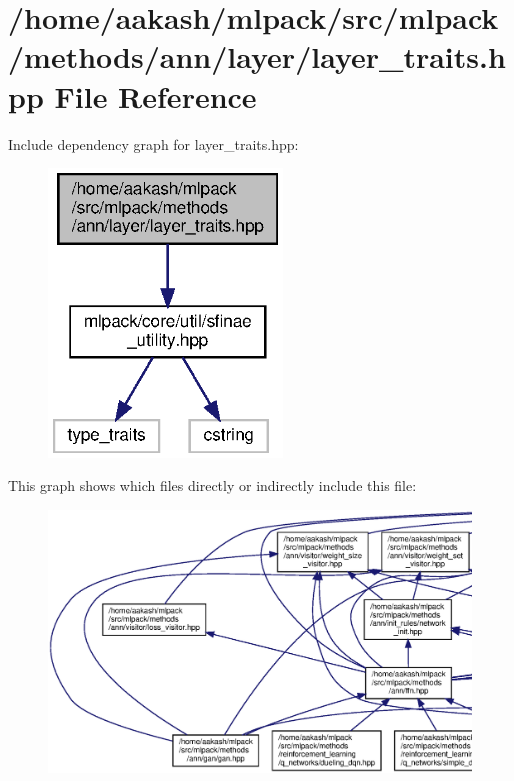 \section{/home/aakash/mlpack/src/mlpack/methods/ann/layer/layer\+\_\+traits.hpp File Reference}
\label{layer__traits_8hpp}
Include dependency graph for layer\+\_\+traits.\+hpp\+:
\nopagebreak
\begin{figure}[H]
\begin{center}
\leavevmode
\includegraphics[width=176pt]{layer__traits_8hpp__incl}
\end{center}
\end{figure}
This graph shows which files directly or indirectly include this file\+:
\nopagebreak
\begin{figure}[H]
\begin{center}
\leavevmode
\includegraphics[width=350pt]{layer__traits_8hpp__dep__incl}
\end{center}
\end{figure}

